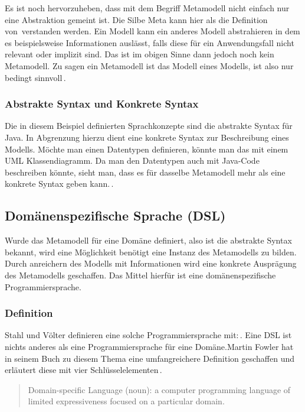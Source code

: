 \documentclass[12pt,oneside,a4paper,parskip]{scrbook}
\begin{document}
Es ist noch hervorzuheben, dass mit dem Begriff Metamodell nicht einfach nur eine Abstraktion gemeint ist. Die Silbe Meta kann hier als  \glqq die Definition von\grqq\ verstanden werden. Ein Modell kann ein anderes Modell abstrahieren in dem es beispielsweise Informationen auslässt, falls diese für ein Anwendungsfall nicht relevant oder implizit sind. Das ist im obigen Sinne dann jedoch noch kein Metamodell. Zu sagen ein Metamodell ist das Modell eines Modells, ist also nur bedingt sinnvoll\,\cite[S. 27]{voelter2013}.

\subsubsection{Abstrakte Syntax und Konkrete Syntax}

Die in diesem Beispiel definierten Sprachkonzepte sind die abstrakte Syntax für Java. In Abgrenzung hierzu dient eine konkrete Syntax zur Beschreibung eines Modells. Möchte man einen Datentypen definieren, könnte man das mit einem UML Klassendiagramm. Da man den Datentypen auch mit Java-Code beschreiben könnte, sieht man, dass es für dasselbe Metamodell mehr als eine konkrete Syntax geben kann.\,\cite[S. 59f.]{stahl2007}.

\subsection{Domänenspezifische Sprache (DSL)}

Wurde das Metamodell für eine Domäne definiert, also ist die abstrakte Syntax bekannt, wird eine Möglichkeit benötigt eine Instanz des Metamodells zu bilden. Durch anreichern des Modells mit Informationen wird eine konkrete Ausprägung des Metamodells geschaffen. Das Mittel hierfür ist eine domänenspezifische Programmiersprache.

\subsubsection{Definition}

Stahl und Völter definieren eine solche Programmiersprache mit:\,\cite[S. 30]{stahl2007}. \glqq Eine DSL ist nichts anderes als eine Programmiersprache für eine Domäne.\grqq Martin Fowler hat in seinem Buch zu diesem Thema eine umfangreichere Definition geschaffen und erläutert diese mit vier Schlüsselelementen\,\cite[S. 27f.]{fowler2010}.

\begin{quote}\glqq Domain-specific Language (noun): a computer programming language of limited expressiveness focused on a particular domain.\grqq \end{quote}
\end{document}
